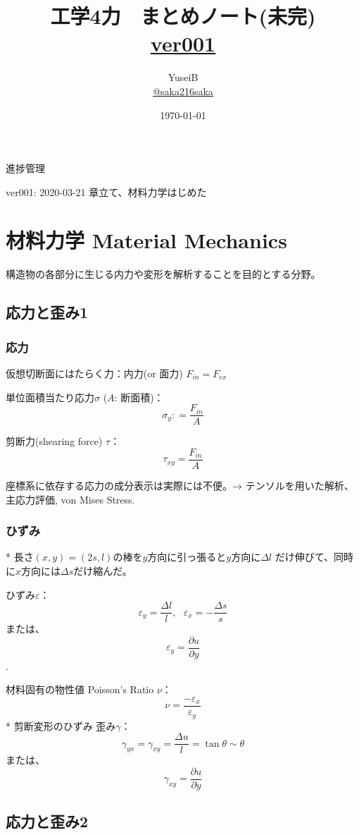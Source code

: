 \documentclass[a4j,10pt,oneside,openany]{jsbook}
\title{工学4力　まとめノート(未完) \\ \small{\url{ver001}}}
\author{YuseiB  \\ \url{@saka216saka}}
\date{\today}
\newcommand{\partialder}[2]{\frac{\partial #1}{\partial #2}}
\newcommand{\coloneqq}{\mathrel{\mathop:}=}
\begin{document}
\maketitle
\frontmatter
\tableofcontents
\mainmatter

進捗管理

ver001: 2020-03-21 章立て、材料力学はじめた

\chapter{材料力学 Material Mechanics}

構造物の各部分に生じる内力や変形を解析することを目的とする分野。

\section{応力と歪み1}
\subsection{応力}
仮想切断面にはたらく力：内力(or 面力) $F_{in} = F_{ex}$

単位面積当たり応力$\sigma$  ($A$: 断面積)：
\[\sigma_y \coloneqq \frac{F_{in}}{A}\]

剪断力(shearing force) $\tau$：
\[\tau_{xy} = \frac{F_{in}}{A}\]

座標系に依存する応力の成分表示は実際には不便。→ テンソルを用いた解析、主応力評価, von Mises Stress.

\subsection{ひずみ}
* 長さ$(x,y) = (2s, l)$の棒を$y$方向に引っ張ると$y$方向に$\Delta l$ だけ伸びて、同時に$x$方向には$\Delta s$だけ縮んだ。

ひずみ$\varepsilon$：
\[ \varepsilon_y = \frac{\Delta l}{l},\ \ \ \varepsilon_x = -\frac{\Delta s}{s}\]
または、
\[\varepsilon_y = \partialder{u}{y}\].

材料固有の物性値 Poisson's Ratio $\nu$：
\[\nu = \frac{-\varepsilon_x}{\varepsilon_y}\]
\newline
* 剪断変形のひずみ
歪み$\gamma$：
\[ \gamma_{yx} = \gamma_{xy} = \frac{\Delta u}{l} = \tan \theta \sim \theta \]
または、
\[\gamma_{xy} = \partialder{u}{y}\]

\section{応力と歪み2}
\end{document}
